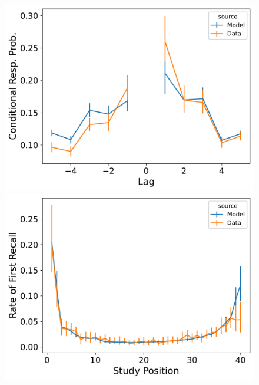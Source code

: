 \documentclass[
  letterpaper,
  11pt,
  english,
  singlespacing,
  headsepline]{MastersDoctoralThesis}
\begin{document}
\begin{figure}
\begin{minipage}{0.33\linewidth}
\includegraphics{icmr_figures/LohnasKahana2014_TraceScalingCMR_Model_Fitting_crp-1.png}\end{minipage}%
%
\begin{minipage}{0.33\linewidth}
\includegraphics{icmr_figures/LohnasKahana2014_TraceScalingCMR_Model_Fitting_pfr-1.png}\end{minipage}%
%
\begin{minipage}{0.33\linewidth}

\end{minipage}
\end{figure}
\end{document}
